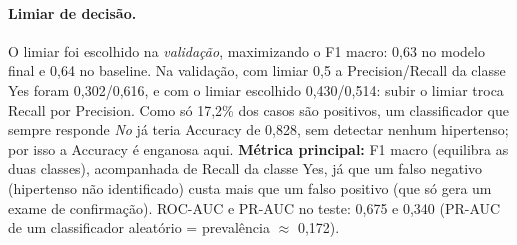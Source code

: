 \documentclass[11pt,a4paper]{article}
\begin{document}
\paragraph{Limiar de decisão.} O limiar foi escolhido na \emph{validação}, maximizando o F1 macro: 0,63 no modelo final e 0,64 no baseline. Na validação, com limiar 0,5 a Precision/Recall da classe Yes foram 0,302/0,616, e com o limiar escolhido 0,430/0,514: subir o limiar troca Recall por Precision. Como só 17,2\% dos casos são positivos, um classificador que sempre responde \emph{No} já teria Accuracy de 0,828, sem detectar nenhum hipertenso; por isso a Accuracy é enganosa aqui. \textbf{Métrica principal:} F1 macro (equilibra as duas classes), acompanhada de Recall da classe Yes, já que um falso negativo (hipertenso não identificado) custa mais que um falso positivo (que só gera um exame de confirmação). ROC-AUC e PR-AUC no teste: 0,675 e 0,340 (PR-AUC de um classificador aleatório = prevalência $\approx$ 0,172).
\end{document}
